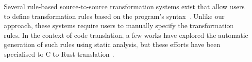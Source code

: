 \documentclass[sigconf]{acmart}
\begin{document}





Several rule-based source-to-source transformation systems exist that allow users to define transformation rules based on the program's syntax~\cite{stratego,txl}. Unlike our approach, these systems require users to manually specify the transformation rules. In the context of code translation, a few works have explored the automatic generation of such rules using static analysis, but these efforts have been specialised to C-to-Rust translation~\cite{DBLP:conf/cav/ZhangDYW23,10.1145/3485498}.

\end{document}
